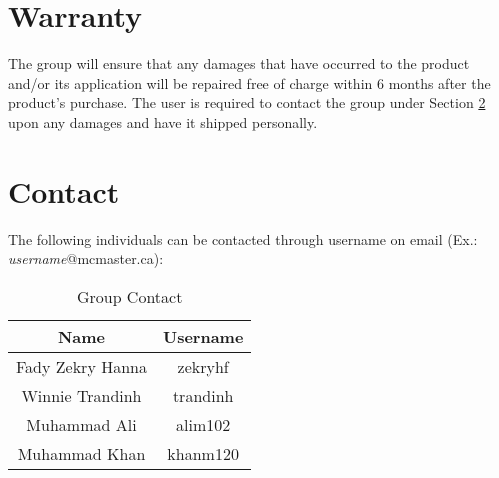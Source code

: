 \documentclass[12pt]{article}
\begin{document}

\section{Warranty} \label{sec:Warranty}

The group will ensure that any damages that have occurred to the product and/or its application will be repaired free of charge within 6 months after the product's purchase. The user is required to contact the group under Section \ref{sec:Contact} upon any damages and have it shipped personally.

\section{Contact} \label{sec:Contact}

The following individuals can be contacted through username on email (Ex.: \textit{username}@mcmaster.ca):

\begin{longtable}{| c | c |}
\caption {Group Contact}
\label{tab:Contact} \\
\hline
\textbf{Name} & \textbf{Username} \\
\hline
\endhead
Fady Zekry Hanna & zekryhf \\
\hline
Winnie Trandinh & trandinh \\
\hline
Muhammad Ali & alim102 \\
\hline
Muhammad Khan & khanm120 \\
\hline
\end{longtable}
\end{document}
